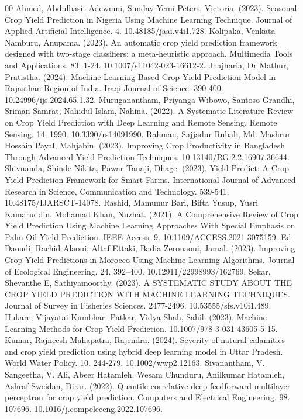 \documentclass[conference]{IEEEtran}
\begin{document}
\begin{thebibliography}{00}
 Ahmed, Abdulbasit Adewumi, Sunday Yemi-Peters, Victoria. (2023). Seasonal Crop Yield Prediction in Nigeria Using Machine Learning Technique. Journal of Applied Artificial Intelligence. 4. 10.48185/jaai.v4i1.728. 
 Kolipaka, Venkata Namburu, Anupama. (2023). An automatic crop yield prediction framework designed with two-stage classifiers: a meta-heuristic approach. Multimedia Tools and Applications. 83. 1-24. 10.1007/s11042-023-16612-2. 
 Jhajharia, Dr Mathur, Pratistha. (2024). Machine Learning Based Crop Yield Prediction Model in Rajasthan Region of India. Iraqi Journal of Science. 390-400. 10.24996/ijs.2024.65.1.32.
 Muruganantham, Priyanga Wibowo, Santoso Grandhi, Sriman Samrat, Nahidul Islam, Nahina. (2022). A Systematic Literature Review on Crop Yield Prediction with Deep Learning and Remote Sensing. Remote Sensing. 14. 1990. 10.3390/rs14091990. 
 Rahman, Sajjadur Rubab, Md. Mashrur Hossain Payal, Mahjabin. (2023). Improving Crop Productivity in Bangladesh Through Advanced Yield Prediction Techniques. 10.13140/RG.2.2.16907.36644. 
 Shivnanda, Shinde Nikita, Pawar Tanaji, Dhage. (2023). Yield Predict: A Crop Yield Prediction Framework for Smart Farms. International Journal of Advanced Research in Science, Communication and Technology. 539-541. 10.48175/IJARSCT-14078. 
 Rashid, Mamunur Bari, Bifta Yusup, Yusri Kamaruddin, Mohamad Khan, Nuzhat. (2021). A Comprehensive Review of Crop Yield Prediction Using Machine Learning Approaches With Special Emphasis on Palm Oil Yield Prediction. IEEE Access. 9. 10.1109/ACCESS.2021.3075159. 
 Ed-Daoudi, Rachid Alaoui, Altaf Ettaki, Badia Zerouaoui, Jamal. (2023). Improving Crop Yield Predictions in Morocco Using Machine Learning Algorithms. Journal of Ecological Engineering. 24. 392–400. 10.12911/22998993/162769. 
 Sekar, Shevanthe E, Sathiyamoorthy. (2023). A SYSTEMATIC STUDY ABOUT THE CROP YIELD PREDICTION WITH MACHINE LEARNING TECHNIQUES. Journal of Survey in Fisheries Sciences. 2477-2496. 10.53555/sfs.v10i1.489. 
 Hukare, Vijayatai Kumbhar -Patkar, Vidya Shah, Sahil. (2023). Machine Learning Methods for Crop Yield Prediction. 10.1007/978-3-031-43605-5-15. 
 Kumar, Rajneesh Mahapatra, Rajendra. (2024). Severity of natural calamities and crop yield prediction using hybrid deep learning model in Uttar Pradesh. World Water Policy. 10. 244-279. 10.1002/wwp2.12163. 
 Sivanantham, V. Sangeetha, V. Ali, Abeer Hatamleh, Wesam Chunduru, Anilkumar Hatamleh, Ashraf Sweidan, Dirar. (2022). Quantile correlative deep feedforward multilayer perceptron for crop yield prediction. Computers and Electrical Engineering. 98. 107696. 10.1016/j.compeleceng.2022.107696. 

\end{thebibliography}
\end{document}
